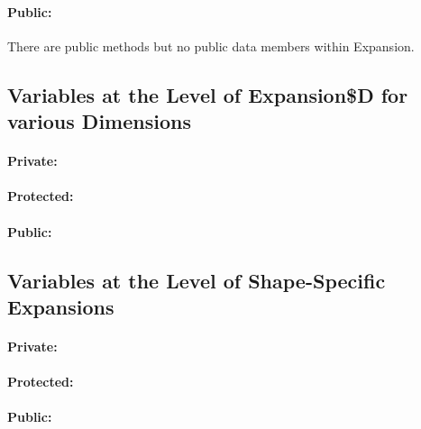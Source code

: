 \paragraph{Public:}

There are public methods but no public data members within Expansion.


\subsection{Variables at the Level of Expansion\$D for various Dimensions}
\paragraph{Private:}

\paragraph{Protected:}

\paragraph{Public:}


\subsection{Variables at the Level of Shape-Specific Expansions}

\paragraph{Private:}

\paragraph{Protected:}

\paragraph{Public:}

